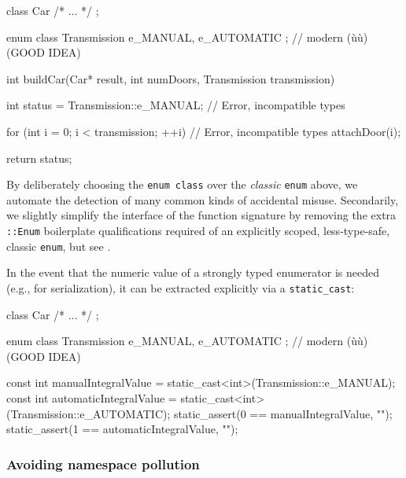 \begin{emcppslisting}[emcppsignore={Fails to build with all Declarations marked Error}]
class Car { /* ... */ };

enum class Transmission { e_MANUAL, e_AUTOMATIC };  // modern (ù{}ù) (GOOD IDEA)

int buildCar(Car* result, int numDoors, Transmission transmission)
{
    int status = Transmission::e_MANUAL;    // Error, incompatible types

    for (int i = 0; i < transmission; ++i)  // Error, incompatible types
    {
         attachDoor(i);
    }

    return status;
}
\end{emcppslisting}

\noindent By deliberately choosing the \lstinline!enum!~\lstinline!class! over the
\emph{classic} \lstinline!enum! above, we automate the detection of many common
kinds of accidental misuse. Secondarily, we slightly simplify the interface of the function signature by removing the extra \lstinline!::Enum! boilerplate qualifications required of an explicitly
scoped, less-type-safe, classic \lstinline!enum!, but see .

In the event that the numeric value of a strongly typed
enumerator is needed (e.g., for serialization), it can be extracted
explicitly via a \lstinline!static_cast!:

\begin{emcppshiddenlisting}[emcppsbatch=e6]
class Car { /* ... */ };

enum class Transmission { e_MANUAL, e_AUTOMATIC };  // modern (ù{}ù) (GOOD IDEA)
\end{emcppshiddenlisting}
\begin{emcppslisting}[emcppsbatch=e6]
const int manualIntegralValue    = static_cast<int>(Transmission::e_MANUAL);
const int automaticIntegralValue = static_cast<int>(Transmission::e_AUTOMATIC);
static_assert(0 == manualIntegralValue,    "");
static_assert(1 == automaticIntegralValue, "");
\end{emcppslisting}

\subsubsection[Avoiding namespace pollution]{Avoiding namespace pollution}\label{avoiding-namespace-pollution}

